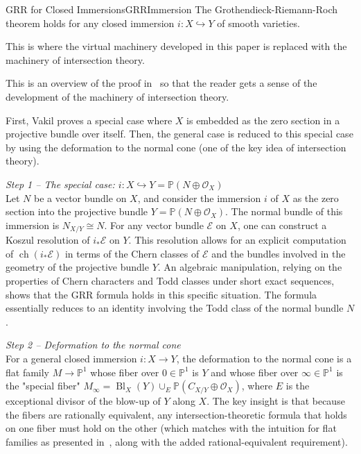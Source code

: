 \documentclass{book}
\newenvironment{Proof}[1][]
  {\begin{ProofTcb}[#1]}
  {\end{ProofTcb}}
\renewcommand{\P}{{\mathbb{P}}}
\newcommand{\CO}{{\mathcal{O}}}
\newcommand{\ch}{{\operatorname{ch}}}
\renewcommand{\ch}{{\operatorname{ch}}}
\begin{document}
\begin{prop}{GRR for Closed Immersions}{GRRImmersion}
    The Grothendieck-Riemann-Roch theorem holds for any closed immersion $i: X \hookrightarrow Y$ of smooth varieties.
\end{prop}

This is where the virtual machinery developed in this paper is replaced with the machinery of intersection
theory.

\begin{Proof}
    This is an overview of the proof in~\cite{vakilIntersectionTheory} so that the reader gets a sense of the
    development of the machinery of intersection theory.

   First, Vakil proves a special case where $X$ is embedded as the zero section in a projective
   bundle over itself. Then, the general case is reduced to this special case by using the deformation to the
   normal cone (one of the key idea of intersection theory).

  \emph{Step 1 -- The special case: $i: X \hookrightarrow Y = \P(N \oplus \CO_X)$}\\
  Let $N$ be a vector bundle on $X$, and consider the immersion $i$ of $X$ as the zero section into the
  projective bundle $Y = \P(N \oplus \CO_X)$. The normal bundle of this immersion is $N_{X/Y} \cong N$. For any
  vector bundle $\mathcal{E}$ on $X$, one can construct a Koszul resolution of $i_*\mathcal{E}$ on $Y$. This
  resolution allows for an explicit computation of $\ch(i_*\mathcal{E})$ in terms of the Chern classes of
  $\mathcal{E}$ and the bundles involved in the geometry of the projective bundle $Y$. An algebraic
  manipulation, relying on the properties of Chern characters and Todd classes under short exact sequences,
  shows that the GRR formula holds in this specific situation. The formula essentially reduces to an identity
  involving the Todd class of the normal bundle $N$.

  \emph{Step 2 -- Deformation to the normal cone}\\
  For a general closed immersion $i: X \to Y$, the deformation to the normal cone is a flat family $M \to \P^1$
  whose fiber over $0 \in \P^1$ is $Y$ and whose fiber over $\infty \in \P^1$ is the "special fiber" $M_\infty =
  \operatorname{Bl}_X(Y) \cup_E \P(C_{X/Y} \oplus \CO_X)$, where $E$ is the exceptional divisor of the blow-up
  of $Y$ along $X$. The key insight is that because the fibers are rationally equivalent, any
  intersection-theoretic formula that holds on one fiber must hold on the other (which matches with the
  intuition for flat families as presented in~\cite{hartshorneAlgebraicGeometry2013}, along with the added
  rational-equivalent requirement).


\end{Proof}
\end{document}
